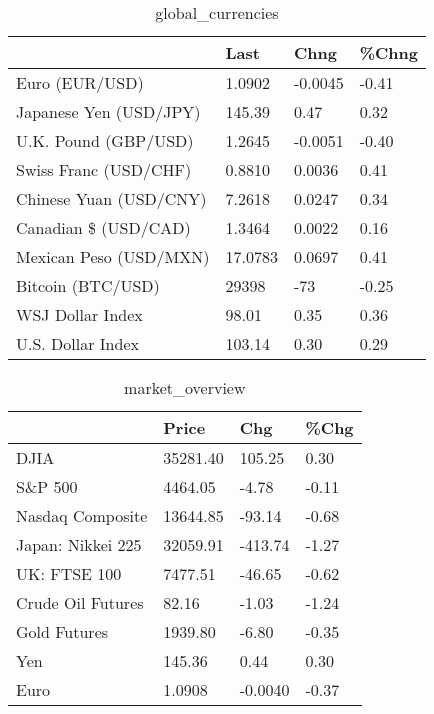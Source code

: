 \documentclass{article}%
\begin{document}
%


\begin{table}[htbp]%
\caption{global\_currencies}%
\centering%
\begin{adjustbox}{width=1\textwidth}%
\begin{tabular}{llll}
\toprule
                       &    Last &    Chng & \%Chng \\
\midrule
        Euro (EUR/USD) &  1.0902 & -0.0045 & -0.41 \\
Japanese Yen (USD/JPY) &  145.39 &    0.47 &  0.32 \\
  U.K. Pound (GBP/USD) &  1.2645 & -0.0051 & -0.40 \\
 Swiss Franc (USD/CHF) &  0.8810 &  0.0036 &  0.41 \\
Chinese Yuan (USD/CNY) &  7.2618 &  0.0247 &  0.34 \\
  Canadian \$ (USD/CAD) &  1.3464 &  0.0022 &  0.16 \\
Mexican Peso (USD/MXN) & 17.0783 &  0.0697 &  0.41 \\
     Bitcoin (BTC/USD) &   29398 &     -73 & -0.25 \\
      WSJ Dollar Index &   98.01 &    0.35 &  0.36 \\
     U.S. Dollar Index &  103.14 &    0.30 &  0.29 \\
\bottomrule
\end{tabular}
%
\end{adjustbox}%
\end{table}

%


\begin{table}[htbp]%
\caption{market\_overview}%
\centering%
\begin{adjustbox}{width=1\textwidth}%
\begin{tabular}{llll}
\toprule
                  &    Price &     Chg &  \%Chg \\
\midrule
             DJIA & 35281.40 &  105.25 &  0.30 \\
          S\&P 500 &  4464.05 &   -4.78 & -0.11 \\
 Nasdaq Composite & 13644.85 &  -93.14 & -0.68 \\
Japan: Nikkei 225 & 32059.91 & -413.74 & -1.27 \\
     UK: FTSE 100 &  7477.51 &  -46.65 & -0.62 \\
Crude Oil Futures &    82.16 &   -1.03 & -1.24 \\
     Gold Futures &  1939.80 &   -6.80 & -0.35 \\
              Yen &   145.36 &    0.44 &  0.30 \\
             Euro &   1.0908 & -0.0040 & -0.37 \\
\bottomrule
\end{tabular}
%
\end{adjustbox}%
\end{table}

%
\end{document}
